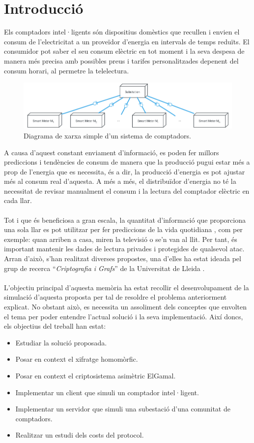 \documentclass{article}
\begin{document}
\part{Introducció}
Els comptadors intel·ligents són dispositius domèstics que recullen i envien 
el consum de l'electricitat a un proveïdor d’energia en intervals de temps reduïts. El consumidor pot saber el seu consum elèctric en tot moment i la seva despesa de manera més precisa amb possibles preus i tarifes personalitzades depenent del consum horari, al permetre la telelectura.
\begin{figure}[H]
	\includegraphics[width=15cm]{umls/network.png}
	\caption{Diagrama de xarxa simple d'un sistema de comptadors.}
\end{figure}
A causa d'aquest constant enviament d'informació,
es poden fer millors prediccions i tendències de consum de manera que la producció pugui estar més a prop de l'energia que es necessita, és a dir, la producció d'energia es pot ajustar més al consum real d'aquesta. A més a més, el distribuïdor d'energia no té la necessitat de revisar manualment el consum i la lectura del comptador elèctric en cada llar.
\\
\\
Tot i que és beneficiosa a gran escala, la quantitat d'informació que proporciona una sola llar es pot utilitzar per fer prediccions de la vida quotidiana \cite{smart-grid-overview}, com per exemple: quan arriben a casa, miren la televisió o se'n van al llit. Per tant, és important mantenir les dades de lectura privades i protegides de qualsevol atac. Arran d'això, s'han realitzat diverses propostes, una d'elles ha estat ideada pel grup de recerca ``\textit{Criptografia i Grafs}'' de la Universitat de Lleida \cite{recsi}.
\\\\
L'objectiu principal d'aquesta memòria ha estat recollir el desenvolupament de la simulació d'aquesta proposta per tal de resoldre el problema anteriorment explicat. No obstant això, es necessita un assoliment dels conceptes que envolten el tema per poder entendre l'actual solució i la seva implementació. 
\newpage
Així doncs, els objectius del treball han estat:
\begin{itemize}
	\item Estudiar la solució proposada.
	\item Posar en context el xifratge homomòrfic.
	\item Posar en context el criptosistema asimètric ElGamal.
	\item Implementar un client que simuli un comptador intel·ligent.
	\item Implementar un servidor que simuli una subestació d'una comunitat de comptadors.
	\item Realitzar un estudi dels costs del protocol.
\end{itemize}
\end{document}

